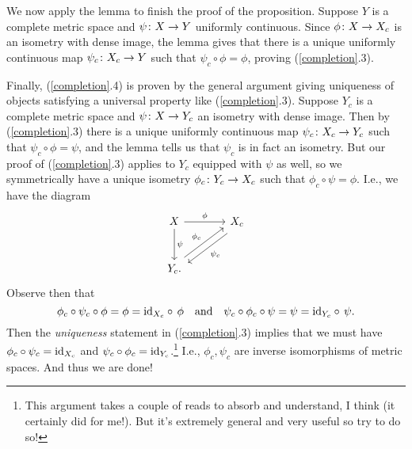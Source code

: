 \begin{nothing}
  We now apply the lemma to finish the proof of the proposition. Suppose
  $Y$ is a complete metric space and $\psi \colon X \to Y$ uniformly
  continuous. Since $\phi \colon X \to X_c$ is an isometry with dense image,
  the lemma gives that there is a unique uniformly continuous map
  $\psi_c \colon X_c \to Y$ such that $\psi_c \circ \phi = \phi$, proving
  (\ref{completion}.3).

  Finally, (\ref{completion}.4) is proven by the general argument giving
  uniqueness of objects satisfying a universal property like
  (\ref{completion}.3). Suppose $Y_c$ is a complete metric space and
  $\psi \colon X \to Y_c$ an isometry with dense image. Then by
  (\ref{completion}.3) there is a unique uniformly continuous map
  $\psi_c \colon X_c \to Y_c$ such that $\psi_c \circ \phi = \psi$, and the
  lemma tells us that $\psi_c$ is in fact an isometry. But our proof of
  (\ref{completion}.3) applies to $Y_c$ equipped with $\psi$ as well, so
  we symmetrically have a unique isometry $\phi_c \colon Y_c \to X_c$ such
  that $\phi_c \circ \psi = \phi$. I.e., we have the diagram
  \[
  \begin{tikzcd}[column sep = large, row sep = large]
    X \rar{\phi} \dar{\psi} & X_c \ar[shift left = .7ex]{dl}{\psi_c}
    \\ Y_c \ar[shift left = .7ex]{ur}{\phi_c}.
  \end{tikzcd}
  \]
  Observe then that
  \[
  \phi_c \circ \psi_c \circ \phi = \phi = \mathrm{id}_{X_c} \circ\, \phi
  \quad\text{and}\quad \psi_c \circ \phi_c \circ \psi = \psi = \mathrm{id}_{Y_c}
  \circ\, \psi.
  \]
  Then the \textit{uniqueness} statement in (\ref{completion}.3) implies
  that we must have $\phi_c \circ \psi_c = \mathrm{id}_{X_c}$ and $\psi_c \circ
  \phi_c = \mathrm{id}_{Y_c}$.\footnote{This argument takes a couple of reads to
    absorb and understand, I think (it certainly did for me!). But it's
    extremely general and very useful so try to do so!} I.e.,
  $\phi_c,\psi_c$ are inverse isomorphisms of metric spaces. And thus we
  are done!
\end{nothing}



